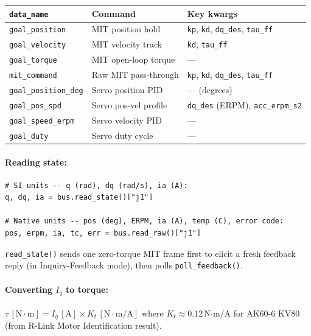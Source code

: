 \documentclass[11pt,a4paper]{article}
\begin{document}
\begin{center}\small
\begin{tabular}{lll}
\toprule
\texttt{data\_name} & Command & Key kwargs \\
\midrule
\texttt{goal\_position}      & MIT position hold    & \texttt{kp}, \texttt{kd}, \texttt{dq\_des}, \texttt{tau\_ff} \\
\texttt{goal\_velocity}      & MIT velocity track   & \texttt{kd}, \texttt{tau\_ff} \\
\texttt{goal\_torque}        & MIT open-loop torque & --- \\
\texttt{mit\_command}        & Raw MIT pass-through & \texttt{kp}, \texttt{kd}, \texttt{dq\_des}, \texttt{tau\_ff} \\
\texttt{goal\_position\_deg} & Servo position PID   & --- (degrees) \\
\texttt{goal\_pos\_spd}      & Servo pos-vel profile & \texttt{dq\_des} (ERPM), \texttt{acc\_erpm\_s2} \\
\texttt{goal\_speed\_erpm}   & Servo velocity PID   & --- \\
\texttt{goal\_duty}          & Servo duty cycle     & --- \\
\bottomrule
\end{tabular}
\end{center}

\paragraph{Reading state:}
\begin{lstlisting}
# SI units -- q (rad), dq (rad/s), ia (A):
q, dq, ia = bus.read_state()["j1"]

# Native units -- pos (deg), ERPM, ia (A), temp (C), error code:
pos, erpm, ia, tc, err = bus.read_raw()["j1"]
\end{lstlisting}

\texttt{read\_state()} sends one zero-torque MIT frame first to elicit a
fresh feedback reply (in Inquiry-Feedback mode), then polls
\texttt{poll\_feedback()}.

\paragraph{Converting $I_q$ to torque:}
$\tau\,[\text{N$\cdot$m}] = I_q\,[\text{A}] \times K_t\,[\text{N$\cdot$m/A}]$
where $K_t \approx 0.12$\,N$\cdot$m/A for AK60-6 KV80
(from R-Link Motor Identification result).

\end{document}
